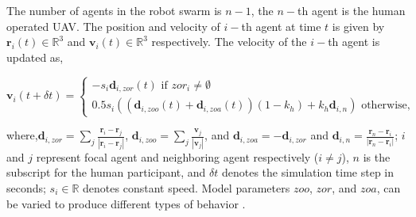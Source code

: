 \documentclass{article}
\begin{document}
The number of agents in the robot swarm is $n-1$, the $n-$th agent is the human operated UAV. The position and velocity of $i-$th agent at time $t$ is given by $\textbf{r}_i(t)\in \mathbb{R}^3$ and $\textbf{v}_i(t) \in \mathbb{R}^3$ respectively. The velocity of the $i-$th agent is updated as,

\begin{equation}
    \textbf{v}_{i}(t+\delta{t}) = \left\{\begin{matrix}
-s_i\mathbf{d}_{i,zor}(t)   \text{ if } \textit{$zor_i$} \neq \emptyset\\
 0.5s_i \left((\mathbf{d}_{i,zoo}(t) + \mathbf{d}_{i,zoa}(t))(1-k_h) + k_h\mathbf{d}_{i,n}\right)
\text{ otherwise},
\end{matrix}\right.
\label{eq:zonalModel}
\end{equation}

where,$\mathbf{d}_{i,zor}=\sum_j\frac{\mathbf{r}_i-\mathbf{r}_j}{|\mathbf{r}_i-\mathbf{r}_j|}$, $\mathbf{d}_{i,zoo}=\sum_j\frac{\mathbf{v}_j}{|\mathbf{v}_j|}$, 
and $\mathbf{d}_{i,zoa} = -\mathbf{d}_{i,zor}$ and $\mathbf{d}_{i,n}= \frac{\mathbf{r}_n-\mathbf{r}_i}{|\mathbf{r}_n-\mathbf{r}_i|}$; $i$ and $j$ represent focal agent and neighboring agent respectively ($i \neq j$), $n$ is the subscript for the human participant, and $\delta t$ denotes the simulation time step in seconds; $s_i \in \mathbb{R}$ denotes constant speed. Model parameters $zoo$, $zor$, and $zoa$, can be varied to produce different types of behavior \cite{Couzin}.

%
%
\end{document}
